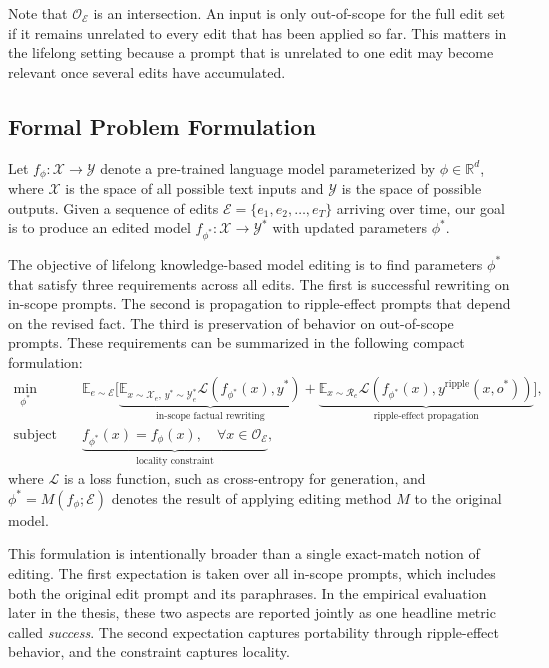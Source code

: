 Note that $\mathcal{O}_{\mathcal{E}}$ is an intersection. An input is only out-of-scope for the full edit set if it remains unrelated to every edit that has been applied so far. This matters in the lifelong setting because a prompt that is unrelated to one edit may become relevant once several edits have accumulated.


\subsection{Formal Problem Formulation}

Let $f_\phi : \mathcal{X} \rightarrow \mathcal{Y}$ denote a pre-trained language model parameterized by $\phi \in \mathbb{R}^d$, where $\mathcal{X}$ is the space of all possible text inputs and $\mathcal{Y}$ is the space of possible outputs. Given a sequence of edits $\mathcal{E} = \{e_1, e_2, \ldots, e_T\}$ arriving over time, our goal is to produce an edited model $f_{\phi^*} : \mathcal{X} \rightarrow \mathcal{Y}^*$ with updated parameters $\phi^*$.

The objective of lifelong knowledge-based model editing is to find parameters $\phi^*$ that satisfy three requirements across all edits. The first is successful rewriting on in-scope prompts. The second is propagation to ripple-effect prompts that depend on the revised fact. The third is preservation of behavior on out-of-scope prompts. These requirements can be summarized in the following compact formulation:
\begin{equation}
\label{eq:kme_objective}
\begin{aligned}
\min_{\phi^*} \quad & \mathbb{E}_{e \sim \mathcal{E}} \Big[
    \underbrace{\mathbb{E}_{x \sim \mathcal{X}_e, \, y^* \sim \mathcal{Y}_e^*} \mathcal{L}(f_{\phi^*}(x), y^*)}_{\text{in-scope factual rewriting}}
    + \underbrace{\mathbb{E}_{x \sim \mathcal{R}_e} \mathcal{L}(f_{\phi^*}(x), y^{\text{ripple}}(x, o^*))}_{\text{ripple-effect propagation}}
    \Big], \\
\text{subject to} \quad & \underbrace{f_{\phi^*}(x) = f_\phi(x), \quad \forall x \in \mathcal{O}_{\mathcal{E}}}_{\text{locality constraint}},
\end{aligned}
\end{equation}
where $\mathcal{L}$ is a loss function, such as cross-entropy for generation, and $\phi^* = M(f_\phi; \mathcal{E})$ denotes the result of applying editing method $M$ to the original model.

This formulation is intentionally broader than a single exact-match notion of editing. The first expectation is taken over all in-scope prompts, which includes both the original edit prompt and its paraphrases. In the empirical evaluation later in the thesis, these two aspects are reported jointly as one headline metric called \textit{success}. The second expectation captures portability through ripple-effect behavior, and the constraint captures locality.


